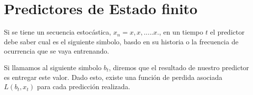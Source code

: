 \section{Predictores de Estado finito}





Si se tiene un secuencia estocástica, $x_{n} = x , x ,.....x .  $, en un tiempo $t$ el predictor debe saber cual es el siguiente simbolo, basdo en su historia o la frecuencia de ocurrencia que se vaya entrenando.

Si llamamos al siguiente simbolo $b_{t}$, diremos que el resultado de nuestro predictor es entregar este valor. Dado esto, existe una función de perdida asociada $L( b_{t},x_{t} )$ para cada predicción realizada. 

